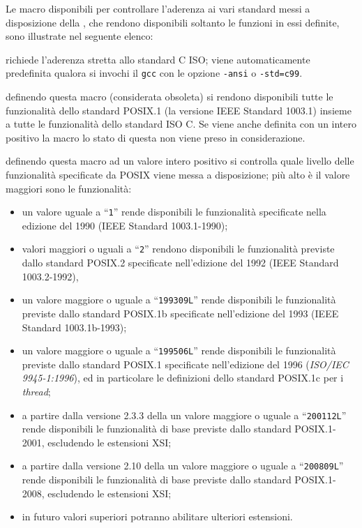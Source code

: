 Le macro disponibili per controllare l'aderenza ai vari standard messi a
disposizione della , che rendono disponibili soltanto le funzioni
in essi definite, sono illustrate nel seguente elenco:
\begin{basedescript}{\desclabelwidth{2.7cm}\desclabelstyle{\nextlinelabel}}
\item[\macrod{\_\_STRICT\_ANSI\_\_}] richiede l'aderenza stretta allo standard
  C ISO; viene automaticamente predefinita qualora si invochi il \texttt{gcc}
  con le opzione \texttt{-ansi} o \texttt{-std=c99}.

\item[\macrod{\_POSIX\_SOURCE}] definendo questa macro (considerata obsoleta)
  si rendono disponibili tutte le funzionalità dello standard POSIX.1 (la
  versione IEEE Standard 1003.1) insieme a tutte le funzionalità dello
  standard ISO C. Se viene anche definita con un intero positivo la macro
   lo stato di questa non viene preso in
  considerazione.

\item[\macrod{\_POSIX\_C\_SOURCE}] definendo questa macro ad un valore intero
  positivo si controlla quale livello delle funzionalità specificate da POSIX
  viene messa a disposizione; più alto è il valore maggiori sono le
  funzionalità:
  \begin{itemize}
  \item un valore uguale a ``\texttt{1}'' rende disponibili le funzionalità
    specificate nella edizione del 1990 (IEEE Standard 1003.1-1990);
  \item valori maggiori o uguali a ``\texttt{2}'' rendono disponibili le
    funzionalità previste dallo standard POSIX.2 specificate nell'edizione del
    1992 (IEEE Standard 1003.2-1992),
  \item un valore maggiore o uguale a ``\texttt{199309L}'' rende disponibili
    le funzionalità previste dallo standard POSIX.1b specificate nell'edizione
    del 1993 (IEEE Standard 1003.1b-1993);
  \item un valore maggiore o uguale a ``\texttt{199506L}'' rende disponibili
    le funzionalità previste dallo standard POSIX.1 specificate nell'edizione
    del 1996 (\textit{ISO/IEC 9945-1:1996}), ed in particolare le definizioni
    dello standard POSIX.1c per i \textit{thread};
  \item a partire dalla versione 2.3.3 della  un valore maggiore o
    uguale a ``\texttt{200112L}'' rende disponibili le funzionalità di base
    previste dallo standard POSIX.1-2001, escludendo le estensioni XSI;
  \item a partire dalla versione 2.10 della  un valore maggiore o
    uguale a ``\texttt{200809L}'' rende disponibili le funzionalità di base
    previste dallo standard POSIX.1-2008, escludendo le estensioni XSI;
  \item in futuro valori superiori potranno abilitare ulteriori estensioni.
  \end{itemize}


\end{basedescript}
